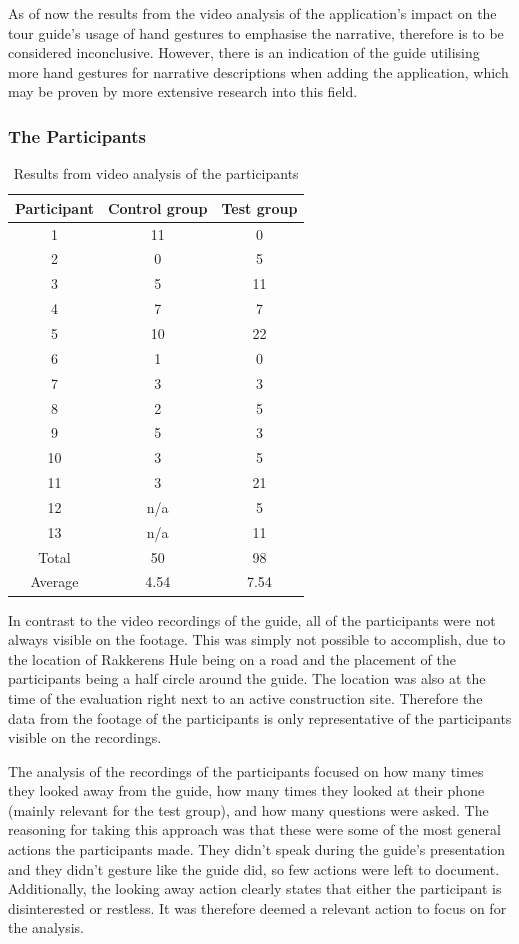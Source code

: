 As of now the results from the video analysis of the application’s impact on the tour guide’s usage of hand gestures to emphasise the narrative, therefore is to be considered inconclusive. However, there is an indication of the guide utilising more hand gestures for narrative descriptions when adding the application, which may be proven by more extensive research into this field.


\subsubsection{The Participants}
\begin{table}
\begin{tabular}{| c | c | c |}\hline
Participant & Control group & Test group \\ \hline
1 & 11 & 0 \\ \hline
2 & 0 & 5 \\ \hline
3 & 5 & 11 \\  \hline
4 & 7 & 7 \\  \hline
5 & 10 & 22 \\  \hline
6 & 1 & 0 \\  \hline
7 & 3 & 3 \\  \hline
8 & 2 & 5 \\  \hline
9 & 5 & 3 \\  \hline
10 & 3 & 5 \\  \hline
11 & 3 & 21 \\  \hline
12 & n/a & 5 \\  \hline
13 & n/a & 11 \\  \hline \hline
Total & 50 & 98 \\  \hline
Average & 4.54 & 7.54 \\  \hline
\end{tabular}
\caption{Results from video analysis of the participants \label{table:participants}}
\end{table}

In contrast to the video recordings of the guide, all of the participants were not always visible on the footage. This was simply not possible to accomplish, due to the location of Rakkerens Hule being on a road and the placement of the participants being a half circle around the guide. The location was also at the time of the evaluation right next to an active construction site. Therefore the data from the footage of the participants is only representative of the participants visible on the recordings. 

The analysis of the recordings of the participants focused on how many times they looked away from the guide, how many times they looked at their phone (mainly relevant for the test group), and how many questions were asked. The reasoning for taking this approach was that these were some of the most general actions the participants made. They didn’t speak during the guide’s presentation and they didn’t gesture like the guide did, so few actions were left to document. Additionally, the looking away action clearly states that either the participant is disinterested or restless. It was therefore deemed a relevant action to focus on for the analysis.

